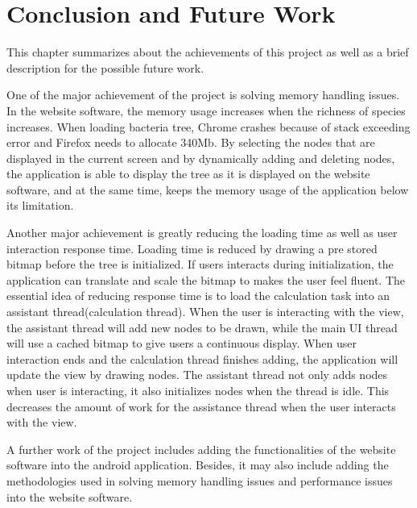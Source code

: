 \documentclass[MSc]{icldt}
\begin{document}
\chapter{Conclusion and Future Work}

This chapter summarizes about the achievements of this project as well as a brief description for the possible future work.

One of the major achievement of the project is solving memory handling issues. In the website software, the memory usage increases when the richness of species increases. When loading bacteria tree, Chrome crashes because of stack exceeding error and Firefox needs to allocate 340Mb. By selecting the nodes that are displayed in the current screen and by dynamically adding and deleting nodes, the application is able to display the tree as it is displayed on the website software, and at the same time, keeps the memory usage of the application below its limitation.

Another major achievement is greatly reducing the loading time as well as user interaction response time. Loading time is reduced by drawing a pre stored bitmap before the tree is initialized. If users interacts during initialization, the application can translate and scale the bitmap to makes the user feel fluent. The essential idea of reducing response time is to load the calculation task into an assistant thread(calculation thread). When the user is interacting with the view, the assistant thread will add new nodes to be drawn, while the main UI thread will use a cached bitmap to give users a continuous display. When user interaction ends and the calculation thread finishes adding, the application will update the view by drawing nodes. The assistant thread not only adds nodes when user is interacting, it also initializes nodes when the thread is idle. This decreases the amount of work for the assistance thread when the user interacts with the view.

A further work of the project includes adding the functionalities of the website software into the android application. Besides, it may also include adding the methodologies used in solving memory handling issues and performance issues into the website software.






{}

\end{document}
